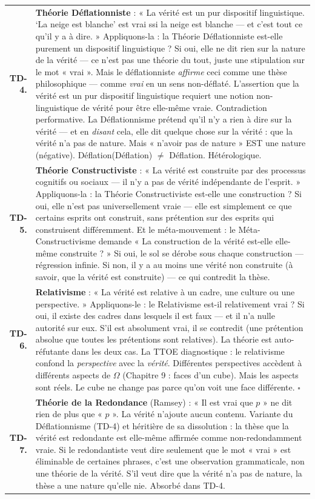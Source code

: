 \documentclass[10pt, openany, oneside]{book}
\begin{document}
{\begin{tabular}{r p{}}
\textbf{TD-4.} & \textbf{Théorie Déflationniste} : « La vérité est un pur dispositif linguistique. `La neige est blanche' est vrai ssi la neige est blanche --- et c'est tout ce qu'il y a à dire. » Appliquons-la : la Théorie Déflationniste est-elle purement un dispositif linguistique ? Si oui, elle ne dit rien sur la nature de la vérité --- ce n'est pas une théorie du tout, juste une stipulation sur le mot « vrai ». Mais le déflationniste \textit{affirme} ceci comme une thèse philosophique --- comme \textit{vrai} en un sens non-déflaté. L'assertion que la vérité est un pur dispositif linguistique requiert une notion non-linguistique de vérité pour être elle-même vraie. Contradiction performative. La Déflationnisme prétend qu'il n'y a rien à dire sur la vérité --- et en \textit{disant} cela, elle dit quelque chose sur la vérité : que la vérité n'a pas de nature. Mais « n'avoir pas de nature » EST une nature (négative). Déflation(Déflation) $\neq$ Déflation. Hétérologique. \\[0.3em]
\textbf{TD-5.} & \textbf{Théorie Constructiviste} : « La vérité est construite par des processus cognitifs ou sociaux --- il n'y a pas de vérité indépendante de l'esprit. » Appliquons-la : la Théorie Constructiviste est-elle une construction ? Si oui, elle n'est pas universellement vraie --- elle est simplement ce que certains esprits ont construit, sans prétention sur des esprits qui construisent différemment. Et le méta-mouvement : le Méta-Constructivisme demande « La construction de la vérité est-elle elle-même construite ? » Si oui, le sol se dérobe sous chaque construction --- régression infinie. Si non, il y a au moins une vérité non construite (à savoir, que la vérité est construite) --- ce qui contredit la thèse. \\[0.5em]
\textbf{TD-6.} & \textbf{Relativisme} : « La vérité est relative à un cadre, une culture ou une perspective. » Appliquons-le : le Relativisme est-il relativement vrai ? Si oui, il existe des cadres dans lesquels il est faux --- et il n'a nulle autorité sur eux. S'il est absolument vrai, il se contredit (une prétention absolue que toutes les prétentions sont relatives). La théorie est auto-réfutante dans les deux cas. La TTOE diagnostique : le relativisme confond la \textit{perspective} avec la \textit{vérité}. Différentes perspectives accèdent à différents aspects de $\Omega$ (Chapitre 9 : faces d'un cube). Mais les aspects sont réels. Le cube ne change pas parce qu'on voit une face différente. $\square$ \\[0.3em]
\textbf{TD-7.} & \textbf{Théorie de la Redondance} (Ramsey) : « Il est vrai que $p$ » ne dit rien de plus que « $p$ ». La vérité n'ajoute aucun contenu. Variante du Déflationnisme (TD-4) et héritière de sa dissolution : la thèse que la vérité est redondante est elle-même affirmée comme non-redondamment vraie. Si le redondantiste veut dire seulement que le mot « vrai » est éliminable de certaines phrases, c'est une observation grammaticale, non une théorie de la vérité. S'il veut dire que la vérité n'a pas de nature, la thèse a une nature qu'elle nie. Absorbé dans TD-4. \\[0.3em]

\end{tabular}}
\end{document}
